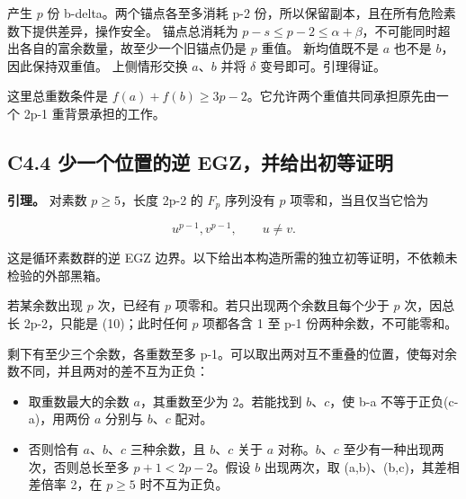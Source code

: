 {产生} {\ensuremath{p}} {份} {b-delta。两个锚点各至多消耗} {p-2} {份，所以保留副本，且在所有危险素数下提供差异，操作安全。} {锚点总消耗为} {\ensuremath{p-s\le p-2\le \alpha +\beta }，不可能同时超出各自的富余数量，故至少一个旧锚点仍是} {\ensuremath{p}} {重值。} {新均值既不是} {\ensuremath{a}} {也不是} {\ensuremath{b}，因此保持双重值。} {上侧情形交换} {\ensuremath{a}、\ensuremath{b}} {并将} {\ensuremath{\delta }} {变号即可。引理得证。}

{这里总重数条件是} {\ensuremath{f(a)+f(b)\ge 3p-2}。它允许两个重值共同承担原先由一个} {2p-1} {重背景承担的工作。}

\subsection*{\texorpdfstring{{C4.4} {少一个位置的逆} {EGZ，并给出初等证明}}{C4.4 少一个位置的逆 EGZ，并给出初等证明}}\label{C4-h22}

\textbf{{引理。}} {对素数} {\ensuremath{p\ge 5}，长度} {2p-2} {的} {\ensuremath{F_{p}}} {序列没有} {\ensuremath{p}} {项零和，当且仅当它恰为}

\[
u^{p-1},v^{p-1},\qquad u\ne v.
\tag{C4.10}
\]

{这是循环素数群的逆} {EGZ} {边界。以下给出本构造所需的独立初等证明，不依赖未检验的外部黑箱。}

{若某余数出现} {\ensuremath{p}} {次，已经有} {\ensuremath{p}} {项零和。若只出现两个余数且每个少于} {\ensuremath{p}} {次，因总长} {2p-2，只能是} {(10)；此时任何} {\ensuremath{p}} {项都各含} {1} {至} {p-1} {份两种余数，不可能零和。}

{剩下有至少三个余数，各重数至多} {p-1。可以取出两对互不重叠的位置，使每对余数不同，并且两对的差不互为正负：}

\begin{itemize}
\tightlist
\item
  {取重数最大的余数} {\ensuremath{a}，其重数至少为} {2。若能找到} {\ensuremath{b}、\ensuremath{c}，使} {b-a} {不等于正负(c-a)，用两份} {\ensuremath{a}} {分别与} {\ensuremath{b}、\ensuremath{c}} {配对。}
\item
  {否则恰有} {\ensuremath{a}、\ensuremath{b}、\ensuremath{c}} {三种余数，且} {\ensuremath{b}、\ensuremath{c}} {关于} {\ensuremath{a}} {对称。\ensuremath{b}、\ensuremath{c}} {至少有一种出现两次，否则总长至多} {\ensuremath{p+1<2p-2}。假设} {\ensuremath{b}} {出现两次，取} {(a,b)、(b,c)，其差相差倍率} {2，在} {\ensuremath{p\ge 5}} {时不互为正负。}
\end{itemize}

